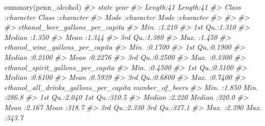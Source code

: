 \documentclass[
]{krantz}
\makeatletter
\newenvironment{Shaded}{\begin{snugshade}}{\end{snugshade}}
\newcommand{\CommentTok}[1]{\textcolor[rgb]{0.37,0.37,0.37}{\textit{#1}}}
\newcommand{\FunctionTok}[1]{\textcolor[rgb]{0,0,0}{#1}}
\newcommand{\NormalTok}[1]{#1}
\newenvironment{kframe}{%
\medskip{}
\setlength{\fboxsep}{.8em}
 \def\at@end@of@kframe{}%
 \ifinner\ifhmode%
  \def\at@end@of@kframe{\end{minipage}}%
  \begin{minipage}{\columnwidth}%
 \fi\fi%
 \def\FrameCommand##1{\hskip\@totalleftmargin \hskip-\fboxsep
 \colorbox{shadecolor}{##1}\hskip-\fboxsep
     \hskip-\linewidth \hskip-\@totalleftmargin \hskip\columnwidth}%
 \MakeFramed {\advance\hsize-\width
   \@totalleftmargin\z@ \linewidth\hsize
   \@setminipage}}%
 {\par\unskip\endMakeFramed%
 \at@end@of@kframe}
\renewenvironment{Shaded}{\begin{kframe}}{\end{kframe}}
\makeatother
\begin{document}
\begin{Shaded}
\begin{Highlighting}[]
\FunctionTok{summary}\NormalTok{(penn\_alcohol)}
\CommentTok{\#\textgreater{}     state               year          }
\CommentTok{\#\textgreater{}  Length:41          Length:41         }
\CommentTok{\#\textgreater{}  Class :character   Class :character  }
\CommentTok{\#\textgreater{}  Mode  :character   Mode  :character  }
\CommentTok{\#\textgreater{}                                       }
\CommentTok{\#\textgreater{}                                       }
\CommentTok{\#\textgreater{}                                       }
\CommentTok{\#\textgreater{}  ethanol\_beer\_gallons\_per\_capita}
\CommentTok{\#\textgreater{}  Min.   :1.210                  }
\CommentTok{\#\textgreater{}  1st Qu.:1.310                  }
\CommentTok{\#\textgreater{}  Median :1.350                  }
\CommentTok{\#\textgreater{}  Mean   :1.344                  }
\CommentTok{\#\textgreater{}  3rd Qu.:1.380                  }
\CommentTok{\#\textgreater{}  Max.   :1.450                  }
\CommentTok{\#\textgreater{}  ethanol\_wine\_gallons\_per\_capita}
\CommentTok{\#\textgreater{}  Min.   :0.1700                 }
\CommentTok{\#\textgreater{}  1st Qu.:0.1900                 }
\CommentTok{\#\textgreater{}  Median :0.2100                 }
\CommentTok{\#\textgreater{}  Mean   :0.2276                 }
\CommentTok{\#\textgreater{}  3rd Qu.:0.2500                 }
\CommentTok{\#\textgreater{}  Max.   :0.3300                 }
\CommentTok{\#\textgreater{}  ethanol\_spirit\_gallons\_per\_capita}
\CommentTok{\#\textgreater{}  Min.   :0.4500                   }
\CommentTok{\#\textgreater{}  1st Qu.:0.5100                   }
\CommentTok{\#\textgreater{}  Median :0.6100                   }
\CommentTok{\#\textgreater{}  Mean   :0.5939                   }
\CommentTok{\#\textgreater{}  3rd Qu.:0.6800                   }
\CommentTok{\#\textgreater{}  Max.   :0.7400                   }
\CommentTok{\#\textgreater{}  ethanol\_all\_drinks\_gallons\_per\_capita number\_of\_beers}
\CommentTok{\#\textgreater{}  Min.   :1.850                         Min.   :286.8  }
\CommentTok{\#\textgreater{}  1st Qu.:2.040                         1st Qu.:310.5  }
\CommentTok{\#\textgreater{}  Median :2.220                         Median :320.0  }
\CommentTok{\#\textgreater{}  Mean   :2.167                         Mean   :318.7  }
\CommentTok{\#\textgreater{}  3rd Qu.:2.330                         3rd Qu.:327.1  }
\CommentTok{\#\textgreater{}  Max.   :2.390                         Max.   :343.7  }

\end{Highlighting}
\end{Shaded}
\end{document}
